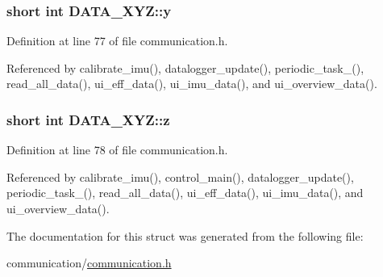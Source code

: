 \hypertarget{structDATA__XYZ_a94bbb1c889bf53eb6a5fffa2b39322cf}{
\subsubsection[{y}]{\setlength{\rightskip}{0pt plus 5cm}short int {\bf DATA\_\-XYZ::y}}}
\label{structDATA__XYZ_a94bbb1c889bf53eb6a5fffa2b39322cf}


Definition at line 77 of file communication.h.



Referenced by calibrate\_\-imu(), datalogger\_\-update(), periodic\_\-task\_(), read\_\-all\_\-data(), ui\_\-eff\_\-data(), ui\_\-imu\_\-data(), and ui\_\-overview\_\-data().

\hypertarget{structDATA__XYZ_a69e89ab0ec6e5d72fc5d54f62cc07fb5}{
\subsubsection[{z}]{\setlength{\rightskip}{0pt plus 5cm}short int {\bf DATA\_\-XYZ::z}}}
\label{structDATA__XYZ_a69e89ab0ec6e5d72fc5d54f62cc07fb5}


Definition at line 78 of file communication.h.



Referenced by calibrate\_\-imu(), control\_\-main(), datalogger\_\-update(), periodic\_\-task\_(), read\_\-all\_\-data(), ui\_\-eff\_\-data(), ui\_\-imu\_\-data(), and ui\_\-overview\_\-data().



The documentation for this struct was generated from the following file:\begin{DoxyCompactItemize}
\item 
communication/\hyperlink{communication_8h}{communication.h}\end{DoxyCompactItemize}
